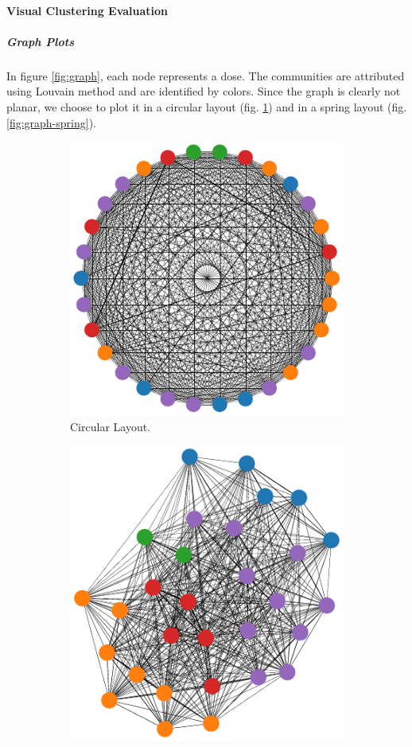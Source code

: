 \paragraph{Visual Clustering Evaluation}
\subparagraph{Graph Plots}
In figure \ref{fig:graph}, each node represents a dose.
The communities are attributed using Louvain method and are identified by colors.
Since the graph is clearly not planar, we choose to plot it in a circular layout (fig. \ref{fig:graph-circular}) and in a spring layout (fig. \ref{fig:graph-spring}).
\begin{figure}
	\centering
	\begin{subfigure}[c]{0.49\textwidth}
		\centering
		\includegraphics[width=0.75\linewidth]{dose_clustering_figures/graph_circular.pdf}
		\caption{Circular Layout.}
		\label{fig:graph-circular}
	\end{subfigure}
	\begin{subfigure}[c]{0.49\textwidth}
		\centering
		\includegraphics[width=0.75\linewidth]{dose_clustering_figures/graph_spring.pdf}

\end{subfigure}
\end{figure}
